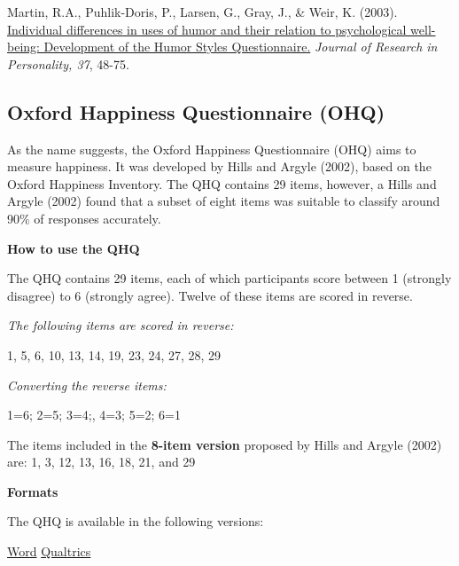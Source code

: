 \documentclass[
]{book}
\begin{document}
Martin, R.A., Puhlik-Doris, P., Larsen, G., Gray, J., \& Weir, K. (2003). \href{https://d1wqtxts1xzle7.cloudfront.net/56892479/HSQ_article.pdf?1530281324=\&response-content-disposition=inline\%3B+filename\%3DIndividual_differences_in_uses_of_humor.pdf\&Expires=1598969255\&Signature=c2oQ1bWDYeWlwZslWOqrGvNdgjeYek-qW6UbPTZVWozQfdWJ8HAKPZHZRSACz1mNY6TYSVsbQgCYsC~1vG7IWPHEnUyQtT2cWsljBOMDj-m6KECtv9OSsQqBWQqTbOQbaGbyRGaCJbbdYEPr4uNZM8zVWZWB0cQU105xtYzzrqyrEQvnR-8x7Y2-7pCwPBMptT8CLRgiv4~WEz1auOoHClqgZ0pAg6Qe8oTVIYFaX40f0gT2At1JKH-xmb1-IHX7wWz9zux-3WMYZ0~jNi4kruIbEHnSS6HrAmF-sin3lWpItwnvWRJ2XbJEFvaU3HqsWTdmsM2WpnIwBQ8I5mCKpw__\&Key-Pair-Id=APKAJLOHF5GGSLRBV4ZA}{Individual differences in uses of humor and their relation to psychological well-being: Development of the Humor Styles Questionnaire.} \emph{Journal of Research in Personality, 37}, 48-75.

\hypertarget{oxford-happiness-questionnaire-ohq}{%
\subsection{Oxford Happiness Questionnaire (OHQ)}\label{oxford-happiness-questionnaire-ohq}}

As the name suggests, the Oxford Happiness Questionnaire (OHQ) aims to measure happiness. It was developed by Hills and Argyle (2002), based on the Oxford Happiness Inventory. The QHQ contains 29 items, however, a Hills and Argyle (2002) found that a subset of eight items was suitable to classify around 90\% of responses accurately.

\textbf{How to use the QHQ}

The QHQ contains 29 items, each of which participants score between 1 (strongly disagree) to 6 (strongly agree). Twelve of these items are scored in reverse.

\emph{The following items are scored in reverse:}

1, 5, 6, 10, 13, 14, 19, 23, 24, 27, 28, 29

\emph{Converting the reverse items:}

1=6; 2=5; 3=4;, 4=3; 5=2; 6=1

The items included in the \textbf{8-item version} proposed by Hills and Argyle (2002) are: 1, 3, 12, 13, 16, 18, 21, and 29

\textbf{Formats}

The QHQ is available in the following versions:

\href{link\%20to\%20file}{Word} \textbar{} \href{link\%20to\%20file}{Qualtrics}
\end{document}
